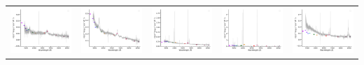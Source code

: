 \begin{center}
\begin{longtable}{l l l l l }
    \includegraphics[width=0.19\linewidth, clip]{Figs/Figs-sdss/spec-0288-52000-0171-SPLUS-n01s26-017374.pdf} & \includegraphics[width=0.19\linewidth, clip]{Figs/Figs-sdss/spec-0288-52000-0561-SPLUS-n02n26-016552.pdf} & \includegraphics[width=0.19\linewidth, clip]{Figs/Figs-sdss/spec-0289-51990-0202-SPLUS-n02s28-039352.pdf} & \includegraphics[width=0.19\linewidth, clip]{Figs/Figs-sdss/spec-0289-51990-0210-SPLUS-n02s27-030322.pdf} & \includegraphics[width=0.19\linewidth, clip]{Figs/Figs-sdss/spec-0289-51990-0234-SPLUS-n01s27-014192.pdf} \\

\end{longtable}
\end{center}
